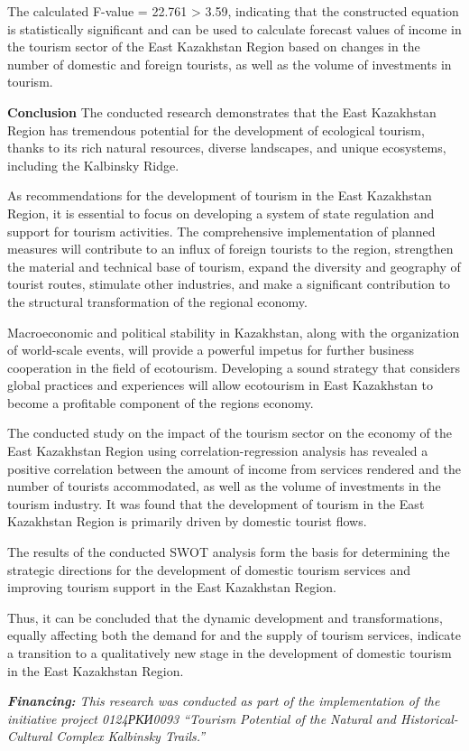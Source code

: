\begin{multicols}{2}
The calculated F-value = 22.761 \textgreater{} 3.59, indicating that the
constructed equation is statistically significant and can be used to
calculate forecast values of income in the tourism sector of the East
Kazakhstan Region based on changes in the number of domestic and foreign
tourists, as well as the volume of investments in tourism.

{\bfseries Conclusion} The conducted research demonstrates that the East
Kazakhstan Region has tremendous potential for the development of
ecological tourism, thanks to its rich natural resources, diverse
landscapes, and unique ecosystems, including the Kalbinsky Ridge.

As recommendations for the development of tourism in the East Kazakhstan
Region, it is essential to focus on developing a system of state
regulation and support for tourism activities. The comprehensive
implementation of planned measures will contribute to an influx of
foreign tourists to the region, strengthen the material and technical
base of tourism, expand the diversity and geography of tourist routes,
stimulate other industries, and make a significant contribution to the
structural transformation of the regional economy.

Macroeconomic and political stability in Kazakhstan, along with the
organization of world-scale events, will provide a powerful impetus for
further business cooperation in the field of ecotourism. Developing a
sound strategy that considers global practices and experiences will
allow ecotourism in East Kazakhstan to become a profitable component of
the region\textquotesingle s economy.

The conducted study on the impact of the tourism sector on the economy
of the East Kazakhstan Region using correlation-regression analysis has
revealed a positive correlation between the amount of income from
services rendered and the number of tourists accommodated, as well as
the volume of investments in the tourism industry. It was found that the
development of tourism in the East Kazakhstan Region is primarily driven
by domestic tourist flows.

The results of the conducted SWOT analysis form the basis for
determining the strategic directions for the development of domestic
tourism services and improving tourism support in the East Kazakhstan
Region.

Thus, it can be concluded that the dynamic development and
transformations, equally affecting both the demand for and the supply of
tourism services, indicate a transition to a qualitatively new stage in
the development of domestic tourism in the East Kazakhstan Region.

\emph{{\bfseries Financing:} This research was conducted as part of the
implementation of the initiative project 0124РКИ0093 ``Tourism Potential
of the Natural and Historical-Cultural Complex
\textquotesingle Kalbinsky Trails\textquotesingle.''}
\end{multicols}

